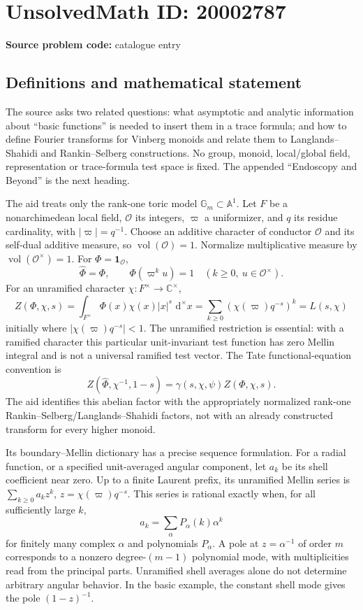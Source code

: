 \documentclass[11pt]{article}
\newcommand{\C}{\mathbb{C}}
\newcommand{\dd}{\,\mathrm{d}}
\begin{document}
\section*{UnsolvedMath ID: 20002787}
\textbf{Source problem code:} catalogue entry
\subsection{Definitions and mathematical statement}
The source asks two related questions: what asymptotic and analytic information about ``basic functions'' is needed to insert them in a trace formula; and how to define Fourier transforms for Vinberg monoids and relate them to Langlands--Shahidi and Rankin--Selberg constructions. No group, monoid, local/global field, representation or trace-formula test space is fixed. The appended ``Endoscopy and Beyond'' is the next heading.

The aid treats only the rank-one toric model $\mathbb G_m\subset\mathbb A^1$. Let $F$ be a nonarchimedean local field, $\mathcal O$ its integers, $\varpi$ a uniformizer, and $q$ its residue cardinality, with $|\varpi|=q^{-1}$. Choose an additive character of conductor $\mathcal O$ and its self-dual additive measure, so $\operatorname{vol}(\mathcal O)=1$. Normalize multiplicative measure by $\operatorname{vol}(\mathcal O^\times)=1$. For $\Phi=\mathbf1_{\mathcal O}$,
\[
 \widehat\Phi=\Phi,\qquad
 \Phi(\varpi^ku)=1\quad(k\ge0,\ u\in\mathcal O^\times).
\]
For an unramified character $\chi:F^\times\to\C^\times$,
\[
 Z(\Phi,\chi,s)=\int_{F^\times}\Phi(x)\chi(x)|x|^s\,\dd^\times x
  =\sum_{k\ge0}(\chi(\varpi)q^{-s})^k
  =L(s,\chi)
\]
initially where $|\chi(\varpi)q^{-s}|<1$. The unramified restriction is essential: with a ramified character this particular unit-invariant test function has zero Mellin integral and is not a universal ramified test vector. The Tate functional-equation convention is
\[
 Z(\widehat\Phi,\chi^{-1},1-s)
       =\gamma(s,\chi,\psi)Z(\Phi,\chi,s).
\]
The aid identifies this abelian factor with the appropriately normalized rank-one Rankin--Selberg/Langlands--Shahidi factors, not with an already constructed transform for every higher monoid.

Its boundary--Mellin dictionary has a precise sequence formulation. For a radial function, or a specified unit-averaged angular component, let $a_k$ be its shell coefficient near zero. Up to a finite Laurent prefix, its unramified Mellin series is $\sum_{k\ge0}a_kz^k$, $z=\chi(\varpi)q^{-s}$. This series is rational exactly when, for all sufficiently large $k$,
\[
 a_k=\sum_\alpha P_\alpha(k)\alpha^k
\]
for finitely many complex $\alpha$ and polynomials $P_\alpha$. A pole at $z=\alpha^{-1}$ of order $m$ corresponds to a nonzero degree-$(m-1)$ polynomial mode, with multiplicities read from the principal parts. Unramified shell averages alone do not determine arbitrary angular behavior. In the basic example, the constant shell mode gives the pole $(1-z)^{-1}$.
\end{document}
